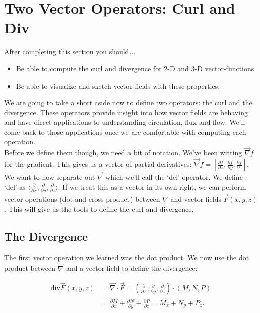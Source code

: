 
\section{Two Vector Operators: Curl and Div}
After completing this section you should...
\begin{itemize}
\item Be able to compute the curl and divergence for 2-D and 3-D vector-functions
\item Be able to visualize and sketch vector fields with these properties.
\end{itemize}

We are going to take a short aside now to define two operators: the curl and the divergence. These operators provide insight into how vector fields are behaving and have direct applications to understanding circulation, flux and flow. We'll come back to those applications once we are comfortable with computing each operation.\\

Before we define them though, we need a bit of notation. We've been writing $\vec \nabla f$ for the gradient. This gives us a vector of partial derivatives:  $\vec \nabla f= \left[ \frac{\partial f}{\partial x},\frac{\partial f}{\partial y},\frac{\partial f}{\partial z}\right]$. We want to now separate out $\vec \nabla$ which we'll call the `del' operator. We define `del' as $\langle \frac{\partial}{\partial x},\frac{\partial}{\partial y},\frac{\partial}{\partial z}\rangle$. If we treat this as a vector in its own right, we can perform vector operations (dot and cross product) between $\vec \nabla$ and vector fields $\vec{F}(x,y,z)$. This will give us the tools to define the curl and divergence.

\subsection{The Divergence}
The first vector operation we learned was the dot product. We now use the dot product between $\vec \nabla$ and a vector field to define the divergence:

\begin{align*}
\text{div}\vec F(x,y,z) 
&= \vec \nabla\cdot \vec F 
= \left(\frac{\partial }{\partial x},\frac{\partial }{\partial y},\frac{\partial }{\partial z} \right)\cdot (M,N,P) \\
&= \frac{\partial M}{\partial x}+\frac{\partial N}{\partial y}+\frac{\partial P}{\partial z} 
= M_x+N_y+P_z 
.
\end{align*}

